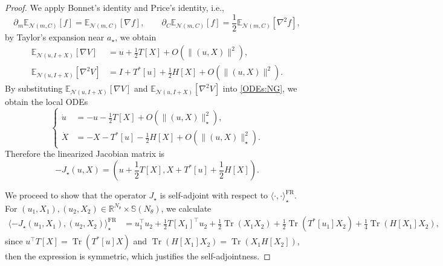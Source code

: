\documentclass[11pt]{article}
\theoremstyle{plain}
\theoremstyle{definition}
\theoremstyle{remark}
\newcommand{\R}{\mathbb{R}}
\newcommand{\N}{\mathcal{N}}
\newcommand{\E}{\mathbb{E}}
\newcommand{\Tr}{\operatorname{Tr}}
\newcommand{\Sym}{\mathbb{S}}
\begin{document}
\begin{proof}
    We apply Bonnet's identity and Price's identity, i.e.,
    \begin{equation*}
        \partial_m \E_{\N (m, C)} [f] = \E_{\N(m, C)} [\nabla f], \qquad \partial_C \E_{\N(m, C)} [f] = \frac{1}{2} \E_{\N(m, C)} [\nabla^2 f],
    \end{equation*}
    by Taylor's expansion near $a_\star$, we obtain
    \begin{align*}
        \E_{\N (u, I + X)} [\nabla V] &= u + \frac{1}{2} T[X] + O (\| (u, X) \|^2), \\
        \E_{\N (u, I + X)} [\nabla^2 V] &= I + T^*[u] + \frac{1}{2} H[X] + O(\|(u, X)\|^2).
    \end{align*}
    By substituting $\E_{\N (u, I + X)} [\nabla V]$ and $\E_{\N (u, I + X)} [\nabla^2 V]$ into \eqref{ODEs:NG}, we obtain the local ODEs
    \begin{equation*}
        \begin{cases}
            \dot u &= -u - \frac{1}{2} T[X] + O(\|(u, X)\|_\star^2), \\
            \dot X &= -X - T^*[u] - \frac{1}{2} H[X] + O(\|(u, X)\|_\star^2).
        \end{cases}
    \end{equation*}
    Therefore the linearized Jacobian matrix is 
    \begin{equation*}
        - J_\star (u, X) = \left( u + \frac{1}{2} T[X], X + T^*[u] + \frac{1}{2} H[X] \right).
    \end{equation*}

    We proceed to show that the operator $J_\star$ is self-adjoint with respect to $\langle \cdot, \cdot \rangle_\star^\mathrm{FR}$. For $(u_1, X_1), (u_2, X_2) \in \R^{N_\theta} \times \Sym (N_\theta)$, we calculate
    \begin{align*}
        \langle -J_\star (u_1, X_1), (u_2, X_2) \rangle_\star^\mathrm{FR} &= u_1^\top u_2 + \frac{1}{2} T[X_1]^\top u_2 + \frac{1}{2} \Tr(X_1 X_2) + \frac{1}{2} \Tr(T^*[u_1] X_2) + \frac{1}{4} \Tr (H[X_1] X_2),
    \end{align*}
    since $u^\top T[X] = \Tr(T^*[u] X)$ and $\Tr(H[X_1] X_2) = \Tr(X_1 H[X_2])$, then the expression is symmetric, which justifies the self-adjointness.


\end{proof}
\end{document}
